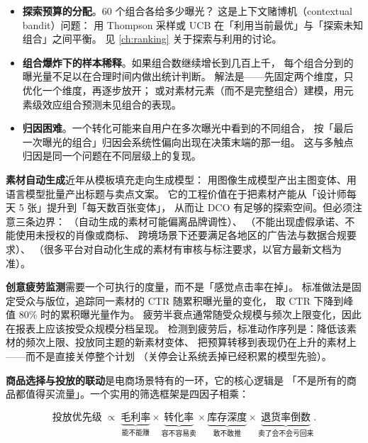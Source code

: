 \begin{itemize}
  \item \textbf{探索预算的分配}。60 个组合各给多少曝光？
        这是上下文赌博机（contextual bandit）问题：
        用 Thompson 采样或 UCB 在「利用当前最优」与「探索未知组合」之间平衡。
        见 \cref{ch:ranking} 关于探索与利用的讨论。
  \item \textbf{组合爆炸下的样本稀释}。如果组合数继续增长到几百上千，
        每个组合分到的曝光量不足以在合理时间内做出统计判断。
        解法是——先固定两个维度，只优化一个维度，再逐步放开；
        或对素材元素（而不是完整组合）建模，用元素级效应组合预测未见组合的表现。
  \item \textbf{归因困难}。一个转化可能来自用户在多次曝光中看到的不同组合，
        按「最后一次曝光的组合」归因会系统性偏向出现在决策末端的那一组。
        这与多触点归因是同一个问题在不同层级上的复现。
\end{itemize}

\textbf{素材自动生成}近年从模板填充走向生成模型：
用图像生成模型产出主图变体、用语言模型批量产出标题与卖点文案。
它的工程价值在于把素材产能从「设计师每天 5 张」提升到「每天数百张变体」，
从而让 DCO 有足够的探索空间。但必须注意三条边界：
（自动生成的素材可能偏离品牌调性）、
（不能出现虚假承诺、不能使用未授权的肖像或商标、
跨境场景下还要满足各地区的广告法与数据合规要求）、
（很多平台对自动化生成的素材有审核与标注要求，以官方最新文档为准）。

\textbf{创意疲劳监测}需要一个可执行的度量，而不是「感觉点击率在掉」。
标准做法是固定受众与版位，追踪同一素材的 CTR 随累积曝光量的变化，
取 CTR 下降到峰值 80\% 时的累积曝光量作为。
疲劳半衰点通常随受众规模与频次上限变化，因此在报表上应该按受众规模分档呈现。
检测到疲劳后，标准动作序列是：降低该素材的频次上限、投放同主题的新素材变体、
把预算转移到表现仍在上升的素材上——而不是直接关停整个计划
（关停会让系统丢掉已经积累的模型先验）。

\textbf{商品选择与投放的联动}是电商场景特有的一环，它的核心逻辑是
「不是所有的商品都值得买流量」。一个实用的筛选框架是四因子相乘：

\begin{equation}
\text{投放优先级} \;\propto\; \underbrace{\text{毛利率}}_{\text{能不能赚}} \times
\underbrace{\text{转化率}}_{\text{容不容易卖}} \times
\underbrace{\text{库存深度}}_{\text{敢不敢推}} \times
\underbrace{\text{退货率倒数}}_{\text{卖了会不会亏回来}} .
\label{eq:sku-priority}
\end{equation}

